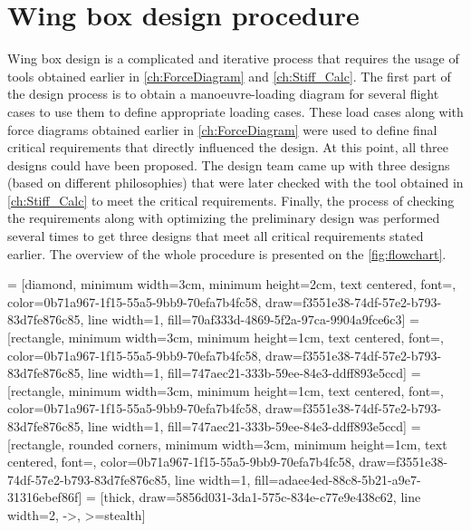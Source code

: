 \section{Wing box design procedure}
\label{sec:design procedure}
Wing box design is a complicated and iterative process that requires the usage of tools obtained earlier in \autoref{ch:ForceDiagram} and \autoref{ch:Stiff_Calc}. The first part of the design process is to obtain a manoeuvre-loading diagram for several flight cases to use them to define appropriate loading cases. These load cases along with force diagrams obtained earlier in \autoref{ch:ForceDiagram} were used to define final critical requirements that directly influenced the design. At this point, all three designs could have been proposed. The design team came up with three designs (based on different philosophies) that were later checked with the tool obtained in \autoref{ch:Stiff_Calc} to meet the critical requirements. Finally, the process of checking the requirements along with optimizing the preliminary design was performed several times to get three designs that meet all critical requirements stated earlier. The overview of the whole procedure is presented on the \autoref{fig:flowchart}.




\usetikzlibrary{shapes.geometric, arrows}




 = [diamond, minimum width=3cm, minimum height=2cm, text centered, font=\large, color=0b71a967-1f15-55a5-9bb9-70efa7b4fc58, draw=f3551e38-74df-57e2-b793-83d7fe876c85, line width=1, fill=70af333d-4869-5f2a-97ca-9904a9fce6c3]
 = [rectangle, minimum width=3cm, minimum height=1cm, text centered, font=\normalsize, color=0b71a967-1f15-55a5-9bb9-70efa7b4fc58, draw=f3551e38-74df-57e2-b793-83d7fe876c85, line width=1, fill=747aec21-333b-59ee-84e3-ddff893e5ccd]
 = [rectangle, minimum width=3cm, minimum height=1cm, text centered, font=\normalsize, color=0b71a967-1f15-55a5-9bb9-70efa7b4fc58, draw=f3551e38-74df-57e2-b793-83d7fe876c85, line width=1, fill=747aec21-333b-59ee-84e3-ddff893e5ccd]
 = [rectangle, rounded corners, minimum width=3cm, minimum height=1cm, text centered, font=\normalsize, color=0b71a967-1f15-55a5-9bb9-70efa7b4fc58, draw=f3551e38-74df-57e2-b793-83d7fe876c85, line width=1, fill=adaee4ed-88c8-5b21-a9e7-31316ebef86f]
 = [thick, draw=5856d031-3da1-575c-834e-c77e9e438c62, line width=2, ->, >=stealth]


